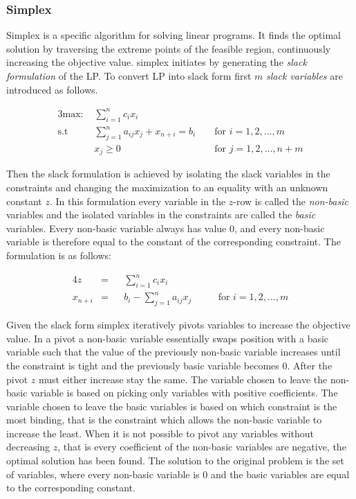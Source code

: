 \subsubsection{Simplex}
Simplex is a specific algorithm for solving linear programs. It finds the optimal solution by traversing the extreme points of the feasible region, continuously increasing the objective value.
simplex initiates by generating the \textit{slack formulation} of the LP. To convert LP into slack form first $m$ \textit{slack variables} are introduced as follows.

\begin{alignat*}{3}
\text{max: } &\sum_{i=1}^{n} c_i x_i\\
\text{s.t }  & \sum_{j=1}^{n} a_{ij} x_j + x_{n+i} = b_i  && \text{ for } i=1,2,...,m\\
& x_j \geq 0                                    && \text{ for } j=1,2,...,n+m
\end{alignat*}

Then the slack formulation is achieved by isolating the slack variables in the constraints and changing the maximization to an equality with an unknown constant $z$. In this formulation every variable in the $z$-row is called the \textit{non-basic} variables and the isolated variables in the constraints are called the \textit{basic} variables. Every non-basic variable always has value 0, and every non-basic variable is therefore equal to the constant of the corresponding constraint. The formulation is as follows:

\begin{alignat*}{4}
z        &= && \sum_{i=1}^{n} c_ix_i\\
x_{n+i}  &= && b_i - \sum_{j=1}^{n} a_{ij} x_j  &&& \text{ for } i=1,2,...,m
\end{alignat*}

Given the slack form simplex iteratively pivots variables to increase the objective value. In a pivot a non-basic variable essentially swaps position with a basic variable such that the value of the previously non-basic variable increases until the constraint is tight and the previously basic variable becomes $0$. After the pivot $z$ must either increase stay the same. The variable chosen to leave the non-basic variable is based on picking only variables with positive coefficients. The variable chosen to leave the basic variables is based on which constraint is the most binding, that is the constraint which allows the non-basic variable to increase the least. When it is not possible to pivot any variables without decreasing $z$, that is every coefficient of the non-basic variables are negative, the optimal solution has been found. The solution to the original problem is the set of variables, where every non-basic variable is $0$ and the basic variables are equal to the corresponding constant.

